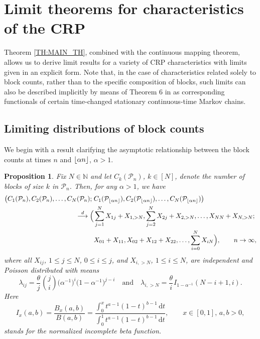 \documentclass[11pt]{article}
\newcommand{\dd}{\mathrm d}
\newcommand{\hs}{\hspace{1pt}}
\newcommand{\N}{\mathbb{N}}
\newcommand{\1}[1][]{
	\ifx&#1&\mathds{1}
	\else\mathds{1}\left\{#1\right\}\fi}
\newcommand{\dto}{\overset{d}{\longrightarrow}}
\newcommand{\Pc}{\mathcal{P}}
\DeclarePairedDelimiter\floor{\lfloor}{\rfloor}
\newtheorem{proposition}{Proposition}[section]
\theoremstyle{definition}
\theoremstyle{remark}
\numberwithin{equation}{section}
\begin{document}
	\section{Limit theorems for characteristics of the CRP}\label{sec4}

	Theorem \ref{TH:MAIN_TH}, combined with the continuous mapping theorem, allows us to derive limit results
	for a variety of CRP characteristics with limits given in an explicit form. Note that, in the case of
	characteristics related solely to block counts, rather than to the specific composition of blocks,
	such limits can also be described implicitly by means of Theorem 6 in \cite{GS23} as corresponding functionals
	of certain time-changed stationary continuous-time Markov chains.
	
	\subsection{Limiting distributions of block counts}
	We begin with a result clarifying the asymptotic relationship between the block counts at times $n$ and $\floor{\alpha n}$, $\alpha>1$.
	
	\begin{proposition}
		\label{prop:counts}
		Fix $N\in\N$ and let $C_k(\Pc_n)$, $k\in [N]$, denote the number of blocks of size $k$ in $\Pc_n$. Then, for any $\alpha>1$, we have
		\begin{equation}
			\label{eq:nan-conv}
			\begin{aligned}
				\bigl(C_1(\Pc_n), C_2(\Pc_n), \ldots, C_N(\Pc_n);\;
				& C_1(\Pc_{\floor{\alpha n}}),
				C_2(\Pc_{\floor{\alpha n}}), \ldots,
				C_N(\Pc_{\floor{\alpha n}}) \bigr) \\ 
				\dto\Bigl(&
				\sum_{j=1}^N X_{1j} + X_{1,>N},
				\sum_{j=2}^N X_{2j} + X_{2,>N},\ldots,
				X_{NN} + X_{N,>N}; \\&
				X_{01} + X_{11},X_{02} + X_{12} + X_{22},\ldots,
				\sum_{i=0}^N X_{iN}\Bigr), \qquad n\to\infty,
			\end{aligned}
		\end{equation}
		where all $X_{ij}$, $1 \le j \le N$, $0 \le i \le j$, and $X_{i, >N}$, $1 \le i \le N$, are independent and Poisson distributed with means
		\begin{equation}
			\label{eq:lambda}
			\lambda_{ij} = \frac{\theta}{j}\hs\binom{j}{i} \bigl(\alpha^{-1}\bigr)^i
			\bigl(1-\alpha^{-1}\bigr)^{j-i} \quad \text{and} \quad
			\lambda_{i,>N} = \frac{\theta}{i}\hs I_{1-\alpha^{-1}}(N-i+1,i).
		\end{equation}
		Here
		\begin{equation*}
			I_x(a,b) = \frac{B_x(a,b)}{B(a,b)} =
			\frac{\int_0^xt^{a-1}(1-t)^{b-1}\,\dd t}
			{\int_0^1t^{a-1}(1-t)^{b-1}\,\dd t}, \qquad x\in[0,1],\, a,b>0,
		\end{equation*}
		stands for the normalized incomplete beta function.
	\end{proposition}
	
\end{document}
